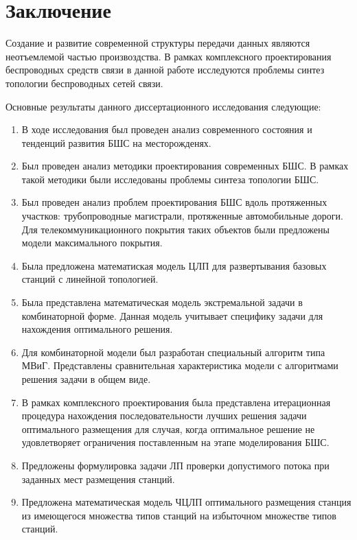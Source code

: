 \chapter*{Заключение}                       %
Создание и развитие современной структуры передачи данных являются неотъемлемой частью произвоздства. В рамках комплексного проектирования беспроводных средств связи в данной работе исследуются проблемы синтез топологии беспроводных сетей связи.

Основные результаты данного диссертационного исследования следующие:
\begin{enumerate}
    \item В ходе исследования был проведен анализ современного состояния и тенденций развития БШС на месторожденях.
    \item Был проведен анализ методики проектирования современных БШС. В рамках такой методики были исследованы проблемы синтеза топологии БШС.
    \item Был проведен анализ проблем проектирования БШС вдоль протяженных участков: трубопроводные магистрали, протяженные автомобильные дороги. Для телекоммуникационного покрытия таких объектов были предложены модели максимального покрытия.
    \item Была предложена математиская модель ЦЛП для развертывания базовых станций с линейной топологией.
    \item Была представлена математическая модель экстремальной задачи в комбинаторной форме. Данная модель учитывает специфику задачи для нахождения оптимального решения.
    \item Для комбинаторной модели был разработан специальный алгоритм типа МВиГ. Представлены сравнительная  характеристика модели с алгоритмами решения задачи в общем виде.
    \item В рамках комплексного проектирования была представлена итерационная процедура нахождения последовательности лучших решения задачи оптимального размещения для случая, когда оптимальное решение не удовлетворяет ограничения поставленным на этапе моделирования БШС.
    \item Предложены формулировка задачи ЛП проверки допустимого потока при заданных мест размещения станций.
    \item Предложена математическая модель ЧЦЛП оптимального размещения станция из имеющегося множества типов станций на избыточном множестве типов станций.
\end{enumerate}



